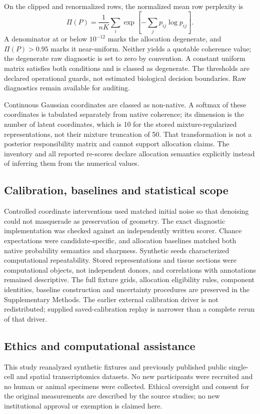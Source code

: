 \documentclass[11pt]{article}
\begin{document}
On the clipped and renormalized rows, the normalized mean row perplexity is
\begin{equation}
 \Pi(P)=\frac{1}{nK}\sum_i\exp\!\left[-\sum_jp_{ij}\log p_{ij}\right].
\end{equation}
A denominator at or below $10^{-12}$ marks the allocation degenerate, and $\Pi(P)>0.95$ marks it near-uniform. Neither yields a quotable coherence value; the degenerate raw diagnostic is set to zero by convention. A constant uniform matrix satisfies both conditions and is classed as degenerate. The thresholds are declared operational guards, not estimated biological decision boundaries. Raw diagnostics remain available for auditing.

Continuous Gaussian coordinates are classed as non-native. A softmax of these coordinates is tabulated separately from native coherence; its dimension is the number of latent coordinates, which is 10 for the stored mixture-regularized representations, not their mixture truncation of 50. That transformation is not a posterior responsibility matrix and cannot support allocation claims. The inventory and all reported re-scores declare allocation semantics explicitly instead of inferring them from the numerical values.



\subsection{Calibration, baselines and statistical scope}
Controlled coordinate interventions used matched initial noise so that denoising could not masquerade as preservation of geometry. The exact diagnostic implementation was checked against an independently written scorer. Chance expectations were candidate-specific, and allocation baselines matched both native probability semantics and sharpness. Synthetic seeds characterized computational repeatability. Stored representations and tissue sections were computational objects, not independent donors, and correlations with annotations remained descriptive. The full fixture grids, allocation eligibility rules, component identities, baseline construction and uncertainty procedures are preserved in the Supplementary Methods. The earlier external calibration driver is not redistributed; supplied saved-calibration replay is narrower than a complete rerun of that driver.

\subsection{Ethics and computational assistance}
This study reanalyzed synthetic fixtures and previously published public single-cell and spatial transcriptomics datasets. No new participants were recruited and no human or animal specimens were collected. Ethical oversight and consent for the original measurements are described by the source studies; no new institutional approval or exemption is claimed here.
\end{document}
